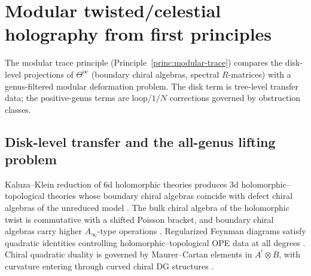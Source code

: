 
\providecommand{\A}{\mathcal A}
\providecommand{\B}{\mathcal B}
\providecommand{\C}{\mathbb C}
\providecommand{\D}{\mathcal D}
\providecommand{\E}{\mathcal E}
\providecommand{\F}{\mathcal F}
\providecommand{\G}{\mathfrak G}
\providecommand{\M}{\mathcal M}
\providecommand{\N}{\mathcal N}
\providecommand{\Q}{\mathbb Q}
\providecommand{\PP}{\mathbb P}
\providecommand{\R}{\mathbb R}
\providecommand{\Z}{\mathbb Z}
\providecommand{\mc}{\mathfrak m}
\providecommand{\h}{\hbar}
\providecommand{\id}{\mathrm{id}}
\providecommand{\Hom}{\operatorname{Hom}}
\providecommand{\MC}{\operatorname{MC}}
\providecommand{\Cone}{\operatorname{Cone}}
\providecommand{\Obs}{\operatorname{Obs}}
\providecommand{\Sym}{\operatorname{Sym}}
\providecommand{\Tr}{\operatorname{Tr}}
\providecommand{\Span}{\operatorname{Span}}
\providecommand{\End}{\operatorname{End}}
\providecommand{\Ext}{\operatorname{Ext}}
\providecommand{\Defcyc}{\operatorname{Def}_{\mathrm{cyc}}}
\providecommand{\Ran}{\operatorname{Ran}}
\providecommand{\gr}{\operatorname{gr}}
\providecommand{\Hb}{H_b^{0,\bullet}(S^3)}
\providecommand{\HCR}{H_{\mathrm{CR}}^{0,\bullet}(S^3)}
\providecommand{\delbar}{\bar\partial}
\providecommand{\delbarb}{\bar\partial_b}
\providecommand{\ot}{\widehat\otimes}
\providecommand{\ov}[1]{\overline{#1}}

\section{Modular twisted/celestial holography from first principles}
\label{sec:modular-twisted-celestial-first-principles}

The modular trace principle (Principle~\ref{princ:modular-trace}) compares the disk-level projections of $\Theta^{\mathrm{oc}}$ (boundary chiral algebras, spectral $R$-matrices) with a genus-filtered modular deformation problem.  The disk term is tree-level transfer data; the positive-genus terms are loop/$1/N$ corrections governed by obstruction classes.

\subsection{Disk-level transfer and the all-genus lifting problem}
\label{subsec:problem-restated-true-level}

Kaluza--Klein reduction of $6$d holomorphic theories produces $3$d holomorphic--topological theories whose boundary chiral algebras coincide with defect chiral algebras of the unreduced model \cite{ZengTwistedHolography}.
The bulk chiral algebra of the holomorphic twist is commutative with a shifted Poisson bracket, and boundary chiral algebras carry higher $A_\infty$-type operations \cite{CostelloDimofteGaiottoBoundary}.
Regularized Feynman diagrams satisfy quadratic identities controlling holomorphic--topological OPE data at all degrees \cite{GKW25}.
Chiral quadratic duality is governed by Maurer--Cartan elements in $A^!\otimes B$, with curvature entering through curved chiral DG structures \cite{GuiLiZengQuadraticDuality}.

